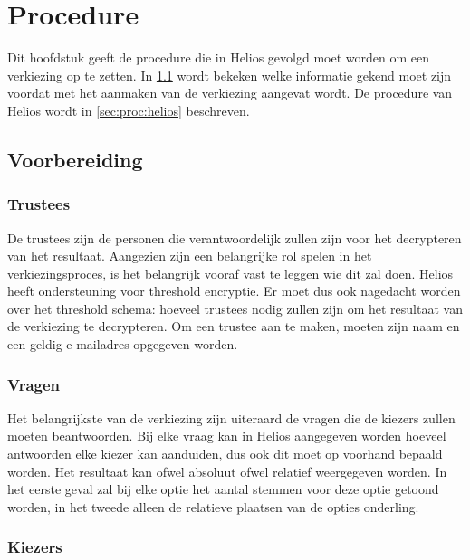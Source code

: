 % 
%

\chapter{Procedure}
\label{chap:procedure}

Dit hoofdstuk geeft de procedure die in Helios gevolgd moet worden om een verkiezing op te zetten. In \ref{sec:proc:voorbereiding} wordt bekeken welke informatie gekend moet zijn voordat met het aanmaken van de verkiezing aangevat wordt. De procedure van Helios wordt in \ref{sec:proc:helios} beschreven.

\section{Voorbereiding}
\label{sec:proc:voorbereiding}

\subsection{Trustees}


De trustees zijn de personen die verantwoordelijk zullen zijn voor het decrypteren van het resultaat. Aangezien zijn een belangrijke rol spelen in het verkiezingsproces, is het belangrijk vooraf vast te leggen wie dit zal doen. Helios heeft ondersteuning voor threshold encryptie. Er moet dus ook nagedacht worden over het threshold schema: hoeveel trustees nodig zullen zijn om het resultaat van de verkiezing te decrypteren. Om een trustee aan te maken, moeten zijn naam en een geldig e-mailadres opgegeven worden.

\subsection{Vragen}
\label{sec:proc:voorbereiding:vragen}

Het belangrijkste van de verkiezing zijn uiteraard de vragen die de kiezers zullen moeten beantwoorden. Bij elke vraag kan in Helios aangegeven worden hoeveel antwoorden elke kiezer kan aanduiden, dus ook dit moet op voorhand bepaald worden. Het resultaat kan ofwel absoluut ofwel relatief weergegeven worden. In het eerste geval zal bij elke optie het aantal stemmen voor deze optie getoond worden, in het tweede alleen de relatieve plaatsen van de opties onderling.

\subsection{Kiezers}
\label{sec:proc:voorbereiding:kiezers}


